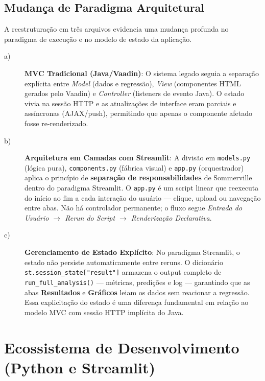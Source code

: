 \section{Mudança de Paradigma Arquitetural}

A reestruturação em três arquivos evidencia uma mudança profunda no paradigma de execução
e no modelo de estado da aplicação.

\begin{description}

\item[a)] \textbf{MVC Tradicional (Java/Vaadin)}: O sistema legado seguia a separação
explícita entre \textit{Model} (dados e regressão), \textit{View} (componentes HTML
gerados pelo Vaadin) e \textit{Controller} (listeners de evento Java). O estado vivia na
sessão HTTP e as atualizações de interface eram parciais e assíncronas (AJAX/push),
permitindo que apenas o componente afetado fosse re-renderizado.

\item[b)] \textbf{Arquitetura em Camadas com Streamlit}: A divisão em
\texttt{models.py} (lógica pura), \texttt{components.py} (fábrica visual) e
\texttt{app.py} (orquestrador) aplica o princípio de \textbf{separação de
responsabilidades} de Sommerville~\cite{sommerville2011} dentro do paradigma Streamlit.
O \texttt{app.py} é um script linear que reexecuta do início ao fim a cada interação do
usuário — clique, upload ou navegação entre abas. Não há controlador permanente; o fluxo
segue \textit{Entrada do Usuário $\rightarrow$ Rerun do Script $\rightarrow$ Renderização
Declarativa}.

\item[c)] \textbf{Gerenciamento de Estado Explícito}: No paradigma Streamlit, o estado
não persiste automaticamente entre reruns. O dicionário
\texttt{st.session\_state["result"]} armazena o output completo de
\texttt{run\_full\_analysis()} — métricas, predições e log — garantindo que as abas
\textbf{Resultados} e \textbf{Gráficos} leiam os dados sem reacionar a regressão. Essa
explicitação do estado é uma diferença fundamental em relação ao modelo MVC com sessão
HTTP implícita do Java.

\end{description}


\chapter{Ecossistema de Desenvolvimento (Python e Streamlit)}

